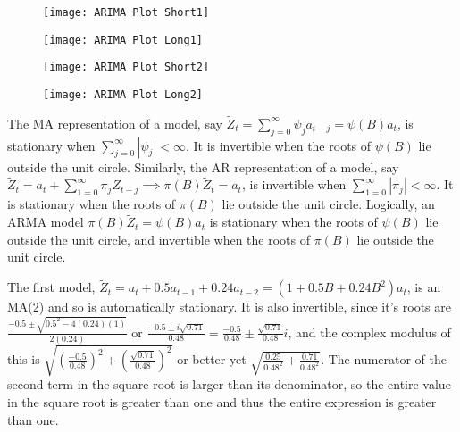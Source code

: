 \documentclass[12pt, letterpaper]{article}
\theoremstyle{definition}
\numberwithin{equation}{section}
\newcommand{\+}[1]{+_{\scalebox{.375}{#1}}}
\newcommand{\1}{\mathbbm{1}}
\begin{document}
\vspace{-0.5cm}
\begin{figure}[H]
	\centering
	\texttt{[image: ARIMA Plot Short1]}
\end{figure}
\vspace{-0.5cm}

\begin{figure}[H]
	\centering
	\texttt{[image: ARIMA Plot Long1]}
\end{figure}
\vspace{-1cm}

\begin{figure}[H]
	\centering
	\texttt{[image: ARIMA Plot Short2]}
\end{figure}
\vspace{-1cm}

\begin{figure}[H]
	\centering
	\texttt{[image: ARIMA Plot Long2]}
\end{figure}


\vspace{\baselineskip}
\noindent\textbf{}
\vspace{\baselineskip}

The MA representation of a model, say $\tilde{Z}_t=\sum\limits_{j=0}^{\infty}\psi_ja_{t-j}=\psi(B)a_t$, is stationary when $\sum\limits_{j=0}^{\infty}|\psi_j|<\infty$. It is invertible when the roots of $\psi(B)$ lie outside the unit circle. Similarly, the AR representation of a model, say $\tilde{Z}_t=a_t+\sum\limits_{1=0}^{\infty}\pi_jZ_{t-j} \implies \pi(B)\tilde{Z}_t=a_t$, is invertible when $\sum\limits_{1=0}^{\infty}|\pi_j|<\infty$. It is stationary when the roots of $\pi(B)$ lie outside the unit circle. Logically, an ARMA model $\pi(B)\tilde{Z}_t=\psi(B)a_t$ is stationary when the roots of $\psi(B)$ lie outside the unit circle, and invertible when the roots of $\pi(B)$ lie outside the unit circle.
\vspace{\baselineskip}

The first model, $\tilde{Z}_t=a_t+0.5a_{t-1}+0.24a_{t-2}=(1+0.5B+0.24B^2)a_t$, is an MA(2) and so is automatically stationary. It is also invertible, since it's roots are $\frac{-0.5 \pm \sqrt{0.5^2-4(0.24)(1)}}{2(0.24)}$ or $\frac{-0.5 \pm i\sqrt{0.71}}{0.48}=\frac{-0.5}{0.48} \pm \frac{\sqrt{0.71}}{0.48}i$, and the complex modulus of this is $\sqrt{\left(\frac{-0.5}{0.48}\right)^2 + \left(\frac{\sqrt{0.71}}{0.48}\right)^2}$ or better yet $\sqrt{\frac{0.25}{0.48^2} + \frac{0.71}{0.48^2}}$. The numerator of the second term in the square root is larger than its denominator, so the entire value in the square root is greater than one and thus the entire expression is greater than one.
\vspace{\baselineskip}
\end{document}
